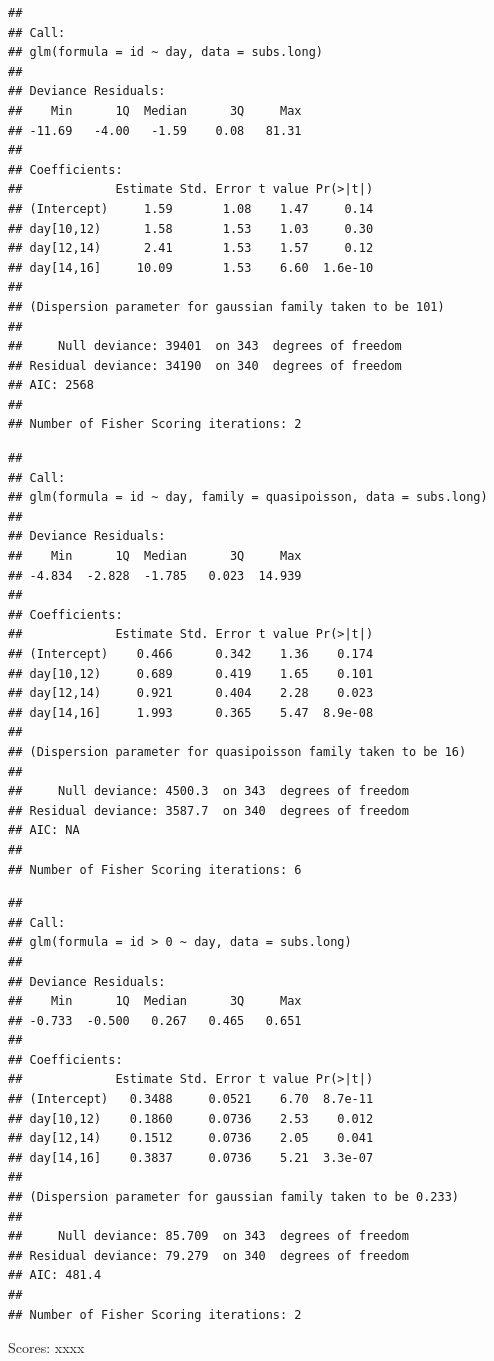 \documentclass[12pt,]{article}
\begin{document}
\begin{verbatim}
## 
## Call:
## glm(formula = id ~ day, data = subs.long)
## 
## Deviance Residuals: 
##    Min      1Q  Median      3Q     Max  
## -11.69   -4.00   -1.59    0.08   81.31  
## 
## Coefficients:
##             Estimate Std. Error t value Pr(>|t|)
## (Intercept)     1.59       1.08    1.47     0.14
## day[10,12)      1.58       1.53    1.03     0.30
## day[12,14)      2.41       1.53    1.57     0.12
## day[14,16]     10.09       1.53    6.60  1.6e-10
## 
## (Dispersion parameter for gaussian family taken to be 101)
## 
##     Null deviance: 39401  on 343  degrees of freedom
## Residual deviance: 34190  on 340  degrees of freedom
## AIC: 2568
## 
## Number of Fisher Scoring iterations: 2
\end{verbatim}

\begin{verbatim}
## 
## Call:
## glm(formula = id ~ day, family = quasipoisson, data = subs.long)
## 
## Deviance Residuals: 
##    Min      1Q  Median      3Q     Max  
## -4.834  -2.828  -1.785   0.023  14.939  
## 
## Coefficients:
##             Estimate Std. Error t value Pr(>|t|)
## (Intercept)    0.466      0.342    1.36    0.174
## day[10,12)     0.689      0.419    1.65    0.101
## day[12,14)     0.921      0.404    2.28    0.023
## day[14,16]     1.993      0.365    5.47  8.9e-08
## 
## (Dispersion parameter for quasipoisson family taken to be 16)
## 
##     Null deviance: 4500.3  on 343  degrees of freedom
## Residual deviance: 3587.7  on 340  degrees of freedom
## AIC: NA
## 
## Number of Fisher Scoring iterations: 6
\end{verbatim}

\begin{verbatim}
## 
## Call:
## glm(formula = id > 0 ~ day, data = subs.long)
## 
## Deviance Residuals: 
##    Min      1Q  Median      3Q     Max  
## -0.733  -0.500   0.267   0.465   0.651  
## 
## Coefficients:
##             Estimate Std. Error t value Pr(>|t|)
## (Intercept)   0.3488     0.0521    6.70  8.7e-11
## day[10,12)    0.1860     0.0736    2.53    0.012
## day[12,14)    0.1512     0.0736    2.05    0.041
## day[14,16]    0.3837     0.0736    5.21  3.3e-07
## 
## (Dispersion parameter for gaussian family taken to be 0.233)
## 
##     Null deviance: 85.709  on 343  degrees of freedom
## Residual deviance: 79.279  on 340  degrees of freedom
## AIC: 481.4
## 
## Number of Fisher Scoring iterations: 2
\end{verbatim}

Scores: xxxx
\end{document}
